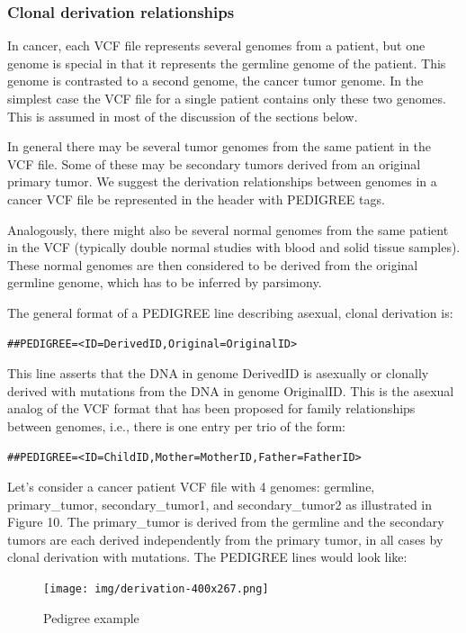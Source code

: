 \documentclass[8pt]{article}
\begin{document}
\subsubsection{Clonal derivation relationships}
\label{PedigreeInDetail}
In cancer, each VCF file represents several genomes from a patient, but one genome is special in that it represents the germline genome of the patient.
This genome is contrasted to a second genome, the cancer tumor genome.
In the simplest case the VCF file for a single patient contains only these two genomes.
This is assumed in most of the discussion of the sections below.

In general there may be several tumor genomes from the same patient in the VCF file.
Some of these may be secondary tumors derived from an original primary tumor.
We suggest the derivation relationships between genomes in a cancer VCF file be represented in the header with PEDIGREE tags.

Analogously, there might also be several normal genomes from the same patient in the VCF (typically double normal studies with blood and solid tissue samples).
These normal genomes are then considered to be derived from the original germline genome, which has to be inferred by parsimony.

The general format of a PEDIGREE line describing asexual, clonal derivation is:

\begin{verbatim}
##PEDIGREE=<ID=DerivedID,Original=OriginalID>
\end{verbatim}

This line asserts that the DNA in genome DerivedID is asexually or clonally derived with mutations from the DNA in genome OriginalID.
This is the asexual analog of the VCF format that has been proposed for family relationships between genomes, i.e., there is one entry per trio of the form:

\begin{verbatim}
##PEDIGREE=<ID=ChildID,Mother=MotherID,Father=FatherID>
\end{verbatim}

Let's consider a cancer patient VCF file with 4 genomes: germline, primary\_tumor, secondary\_tumor1, and secondary\_tumor2 as illustrated in Figure 10.
The primary\_tumor is derived from the germline and the secondary tumors are each derived independently from the primary tumor, in all cases by clonal derivation with mutations.
The PEDIGREE lines would look like:

\begin{figure}[ht]
\centering
\texttt{[image: img/derivation-400x267.png]}
\caption{Pedigree example}
\end{figure}
\end{document}
